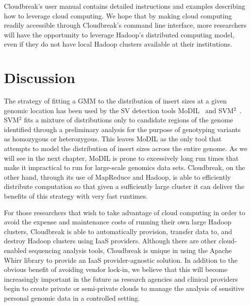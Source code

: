 Cloudbreak's user manual contains detailed instructions and examples describing how to leverage cloud computing. We hope that by making cloud computing readily accessible through Cloudbreak's command line interface, more researchers will have the opportunity to leverage Hadoop's distributed computing model, even if they do not have local Hadoop clusters available at their institutions.

\section{Discussion}

The strategy of fitting a GMM to the distribution of insert sizes at a given genomic location has been used by the SV detection tools MoDIL~\cite{Lee:2009da} and SVM$^2$~\cite{Chiara:2012ey}. SVM$^2$ fits a mixture of distributions only to candidate regions of the genome identified through a preliminary analysis for the purpose of genotyping variants as homozygous or heterozygous. This leaves MoDIL as the only tool that attempts to model the distribution of insert sizes across the entire genome. As we will see in the next chapter, MoDIL is prone to excessively long run times that make it impractical to run for large-scale genomics data sets. Cloudbreak, on the other hand, through its use of MapReduce and Hadoop, is able to efficiently distribute computation so that given a sufficiently large cluster it can deliver the benefits of this strategy with very fast runtimes.

For those researchers that wish to take advantage of cloud computing in order to avoid the expense and maintenance costs of running their own large Hadoop clusters, Cloudbreak is able to automatically provision, transfer data to, and destroy Hadoop clusters using IaaS providers. Although there are other cloud-enabled sequencing analysis tools, Cloudbreak is unique in using the Apache Whirr library to provide an IaaS provider-agnostic solution. In addition to the obvious benefit of avoiding vendor lock-in, we believe that this will become increasingly important in the future as research agencies and clinical providers begin to create private or semi-private clouds to manage the analysis of sensitive personal genomic data in a controlled setting.